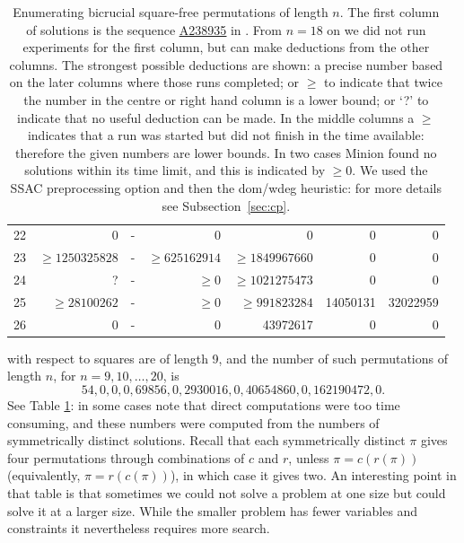 \documentclass[12pt,reqno]{article}
\newcommand{\seqnum}[1]{\href{http://oeis.org/#1}{\underline{#1}}}
\begin{document}
\begin{table}[H]
\begin{center}
\begin{tabular}{r|rr|rr|rr}
22 & 0 
 & -
 &            0 &            0 &            0 &            0 \\
23 & $\geq 1250325828$  & -
& $\geq 625162914$ & $\geq 1849967660$ &            0 &            0 \\
24 & ?
 & -
& $\geq 0$  & $\geq 1021275473$ &            0 &            0 \\
25 & $ \geq 28100262 $
 & - 
& $\geq 0$ & $ \geq 991823284 $  &     14050131 &     32022959 \\
26 & 0
 & -
 &            0 &     43972617 &            0 &            0 \\
\end{tabular}
\end{center}
\caption{Enumerating bicrucial square-free permutations of length $n$. The first column of solutions is the sequence \seqnum{A238935} in \cite{OEIS}.  From $n=18$ on we did not run experiments for the first column, but can make deductions from the other columns.  The strongest possible deductions are shown: a precise number based on the later columns where those runs completed; or $\geq$ to indicate that twice the number in the centre or right hand column is a lower bound; or `?' to indicate that no useful deduction can be made.  In the middle columns a $\geq$ indicates that a run was started but did not finish in the time available: therefore the given numbers are lower bounds. In two cases Minion found no solutions within its time limit, and this is indicated by $\geq 0$.
We used the SSAC preprocessing option and then the dom/wdeg heuristic: for more details see Subsection~\ref{sec:cp}.}
\label{tab:maximal}
\end{table}


\noindent with respect to squares are of length 9, and the number of such permutations of length $n$, for $n=9,10,\ldots, 20$, is
$$54, 0, 0, 0, 69856, 0, 2930016, 0, 40654860, 0, 162190472,0.$$ 
See  Table \ref{tab:maximal}: in some cases note that direct computations were too time consuming, and these numbers were computed from the numbers of symmetrically distinct solutions.  Recall that each symmetrically distinct $\pi$ gives four permutations through combinations of $c$ and $r$, unless $\pi = c(r(\pi))$ (equivalently, $\pi = r(c(\pi))$), in which case it gives two.    An interesting point in that table is that sometimes we could not solve a problem at one size but could solve it at a larger size.  While the smaller problem has fewer variables and constraints it nevertheless requires more search.   
\end{document}
